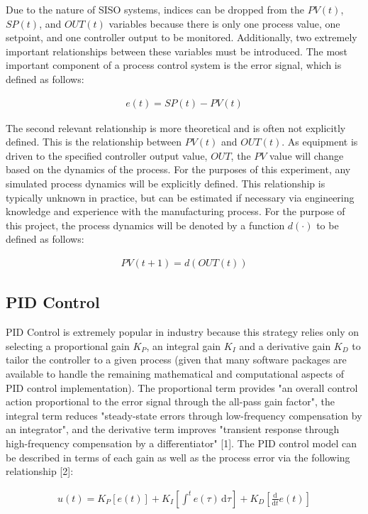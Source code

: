 \documentclass{article}
\begin{document}
Due to the nature of SISO systems, indices can be dropped from the $PV(t)$, $SP(t)$, and $OUT(t)$ variables because there is only one process value, one setpoint, and one controller output to be monitored.  Additionally, two extremely important relationships between these variables must be introduced.  The most important component of a process control system is the error signal, which is defined as follows:

\begin{gather*}
e(t) = SP(t) - PV(t)
\end{gather*}

The second relevant relationship is more theoretical and is often not explicitly defined.  This is the relationship between $PV(t)$ and $OUT(t)$.  As equipment is driven to the specified controller output value, $OUT$, the $PV$ value will change based on the dynamics of the process.  For the purposes of this experiment, any simulated process dynamics will be explicitly defined.  This relationship is typically unknown in practice, but can be estimated if necessary via engineering knowledge and experience with the manufacturing process.  For the purpose of this project, the process dynamics will be denoted by a function $d(\cdot)$ to be defined as follows:

\begin{gather*}
PV(t+1) = d(OUT(t))
\end{gather*}

\subsection{PID Control}

PID Control is extremely popular in industry because this strategy relies only on selecting a proportional gain $K_P$, an integral gain $K_I$ and a derivative gain $K_D$ to tailor the controller to a given process (given that many software packages are available to handle the remaining mathematical and computational aspects of PID control implementation). The proportional term provides "an overall control action proportional to the error signal through the all-pass gain factor", the integral term reduces "steady-state errors through low-frequency compensation by an integrator", and the derivative term improves "transient response through high-frequency compensation by a differentiator" [1].  The PID control model can be described in terms of each gain as well as the process error via the following relationship [2]:

\begin{gather*}
u(t) = K_P [e(t)] + K_I [\int^t \! e(\tau) \, \mathrm{d}\tau] + K_D [\frac{\mathrm{d}}{\mathrm{d}t} e(t)]
\end{gather*}
\end{document}
